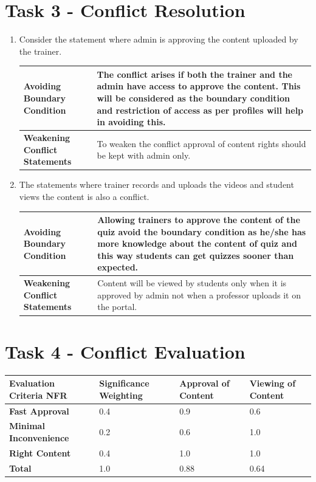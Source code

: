\documentclass{article}
\begin{document}
\section{Task 3 - Conflict Resolution}
\begin{enumerate}
    \item Consider the statement where admin is approving the content uploaded by the trainer.\\[0.3cm]
    \begin{tabular}{|p{3.5cm}|p{8.5cm}|} \hline
        \textbf{Avoiding Boundary Condition} & The conflict arises if both the trainer and the admin have access to approve the content. This will be considered as the boundary condition and restriction of access as per profiles will help in avoiding this.  \\ \hline
        \textbf{Weakening Conflict Statements} & To weaken the conflict approval of content rights should be kept with admin only.\\ \hline
    \end{tabular}
    \item The statements where trainer records and uploads the videos and student views the content is also a conflict.\\[0.3cm]
    \begin{tabular}{|p{3.5cm}|p{8.5cm}|} \hline
        \textbf{Avoiding Boundary Condition} & Allowing trainers to approve the content of the quiz avoid the boundary condition as he/she has more knowledge about the content of quiz and this way students can get quizzes sooner than expected.  \\ \hline
        \textbf{Weakening Conflict Statements} & Content will be viewed by students only when it is approved by admin not when a professor uploads it on the portal.\\ \hline
    \end{tabular}
\end{enumerate}

\section{Task 4 - Conflict Evaluation}
\begin{tabular}{|p{3cm}|p{3cm}|p{3cm}|p{3cm}|}
\hline
\textbf{Evaluation Criteria NFR}&\textbf{Significance Weighting}&\textbf{Approval of Content}&\textbf{Viewing of Content}\\ \hline
\textbf{Fast Approval}&0.4&0.9&0.6\\ \hline
\textbf{Minimal Inconvenience}&0.2&0.6&1.0\\ \hline
\textbf{Right Content}&0.4&1.0&1.0\\ \hline
\textbf{Total}&1.0&0.88&0.64\\ \hline
\end{tabular}
\end{document}
